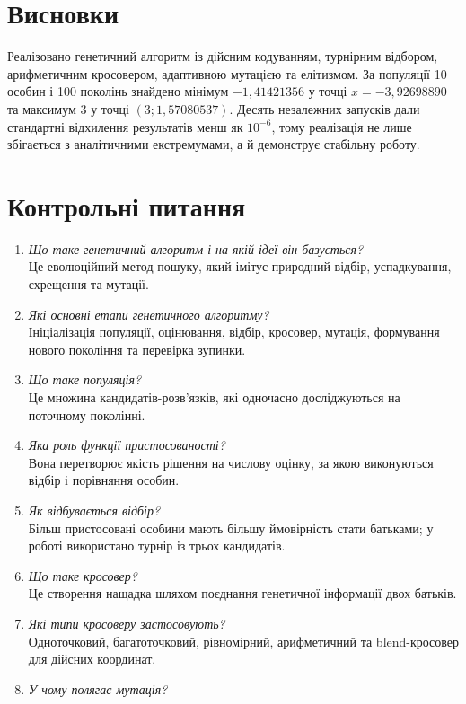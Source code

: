 \documentclass[12pt,a4paper]{article}
\begin{document}
\section{Висновки}
Реалізовано генетичний алгоритм із дійсним кодуванням, турнірним відбором, арифметичним кросовером, адаптивною мутацією та елітизмом. За популяції 10 особин і 100 поколінь знайдено мінімум $-1{,}41421356$ у точці $x=-3{,}92698890$ та максимум 3 у точці $(3;1{,}57080537)$. Десять незалежних запусків дали стандартні відхилення результатів менш як $10^{-6}$, тому реалізація не лише збігається з аналітичними екстремумами, а й демонструє стабільну роботу.

\section{Контрольні питання}
\begin{enumerate}[leftmargin=*]
\item \textit{Що таке генетичний алгоритм і на якій ідеї він базується?}\\
Це еволюційний метод пошуку, який імітує природний відбір, успадкування, схрещення та мутації.
\item \textit{Які основні етапи генетичного алгоритму?}\\
Ініціалізація популяції, оцінювання, відбір, кросовер, мутація, формування нового покоління та перевірка зупинки.
\item \textit{Що таке популяція?}\\
Це множина кандидатів-розв'язків, які одночасно досліджуються на поточному поколінні.
\item \textit{Яка роль функції пристосованості?}\\
Вона перетворює якість рішення на числову оцінку, за якою виконуються відбір і порівняння особин.
\item \textit{Як відбувається відбір?}\\
Більш пристосовані особини мають більшу ймовірність стати батьками; у роботі використано турнір із трьох кандидатів.
\item \textit{Що таке кросовер?}\\
Це створення нащадка шляхом поєднання генетичної інформації двох батьків.
\item \textit{Які типи кросоверу застосовують?}\\
Одноточковий, багатоточковий, рівномірний, арифметичний та blend-кросовер для дійсних координат.
\item \textit{У чому полягає мутація?}\\

\end{enumerate}
\end{document}
